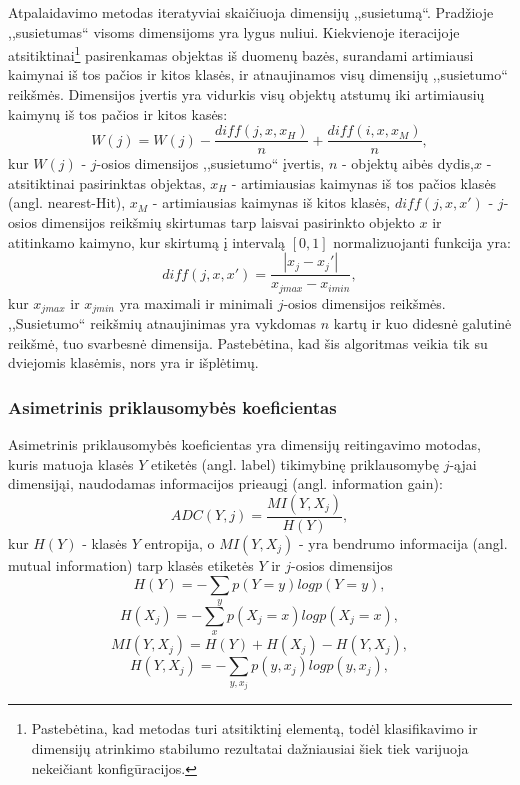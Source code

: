 Atpalaidavimo metodas iteratyviai skaičiuoja dimensijų ,,susietumą``. Pradžioje
,,susietumas`` visoms dimensijoms yra lygus nuliui. Kiekvienoje
iteracijoje atsitiktinai\footnote{Pastebėtina, kad metodas 
turi atsitiktinį elementą, todėl klasifikavimo ir  dimensijų atrinkimo stabilumo
rezultatai dažniausiai šiek tiek varijuoja nekeičiant konfigūracijos.} 
pasirenkamas objektas iš duomenų bazės, surandami
artimiausi kaimynai iš tos pačios ir kitos klasės, ir atnaujinamos visų 
dimensijų ,,susietumo`` reikšmės. Dimensijos įvertis yra vidurkis visų objektų
atstumų iki artimiausių kaimynų iš tos pačios ir kitos kasės:
\begin{equation}
 W(j)=W(j) - \frac{diff(j, x, x_H)}{n} + \frac{diff(i, x, x_M)}{n},
\end{equation}
kur $W(j)$ - $j$-osios dimensijos ,,susietumo`` įvertis, $n$ - objektų aibės 
dydis,$x$ - atsitiktinai pasirinktas objektas, $x_H$ - artimiausias
kaimynas iš tos pačios klasės (angl. nearest-Hit), $x_M$ - artimiausias kaimynas
iš kitos klasės, $diff(j, x, x')$ - $j$-osios dimensijos reikšmių skirtumas
tarp laisvai pasirinkto objekto $x$ ir atitinkamo kaimyno, kur skirtumą į
intervalą $[0, 1]$ normalizuojanti funkcija yra:
\begin{equation}
 diff(j, x, x')=\frac{|x_j- x_j'|}{x_{j max} - x_{i min}},
\end{equation}
kur $x_{j max}$ ir $x_{j min}$ yra maximali ir minimali $j$-osios dimensijos
reikšmės. ,,Susietumo`` reikšmių atnaujinimas yra vykdomas $n$ kartų ir kuo
didesnė galutinė reikšmė, tuo svarbesnė dimensija. Pastebėtina, kad šis algoritmas
veikia tik su dviejomis klasėmis, nors yra ir išplėtimų.

\subsubsection{Asimetrinis priklausomybės koeficientas}

Asimetrinis priklausomybės koeficientas yra dimensijų reitingavimo motodas,
kuris matuoja klasės $Y$ etiketės (angl. label) tikimybinę priklausomybę $j$-ąjai
dimensijąi, naudodamas informacijos prieaugį (angl. information gain):
\begin{equation}
 ADC(Y, j) = \frac{MI(Y, X_j)}{H(Y)},
\end{equation}
kur $H(Y)$ - klasės $Y$ entropija, o $MI(Y, X_j)$ - yra bendrumo informacija
(angl. mutual information) tarp klasės etiketės $Y$ ir $j$-osios dimensijos
\begin{equation}
 H(Y)=-\sum_y{p(Y=y)log{p(Y=y)}}, 
\end{equation}
\begin{equation}
 H(X_j)=-\sum_x{p(X_j=x) log{p(X_j=x)}},
\end{equation}
\begin{equation}
 MI(Y, X_j) = H(Y) + H(X_j) - H(Y, X_j),
\end{equation}
\begin{equation}
 H(Y, X_j) = -\sum_{y,x_j}{p(y, x_j)log{p(y, x_j)}},
\end{equation}

